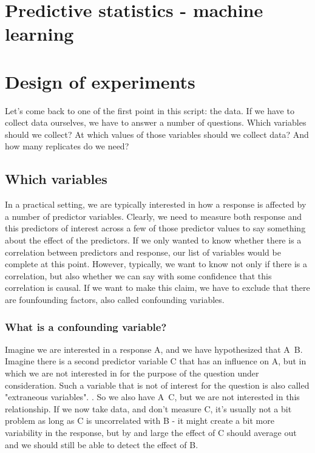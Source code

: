 \documentclass[a4paper,twoside]{tufte-book} %
\begin{document}
\chapter{Predictive statistics - machine learning}



\chapter{Design of experiments}

Let's come back to one of the first point in this script: the data. If we have to collect data ourselves, we have to answer a number of questions. Which variables should we collect? At which values of those variables should we collect data? And how many replicates do we need?

\section{Which variables}

In a practical setting, we are typically interested in how a response is affected by a number of predictor variables. Clearly, we need to measure both response and this predictors of interest across a few of those predictor values to say something about the effect of the predictors.  If we only wanted to know whether there is a correlation between predictors and response, our list of variables would be complete at this point. However, typically, we want to know not only if there is a correlation, but also whether we can say with some confidence that this correlation is causal. If we want to make this claim, we have to exclude that there are founfounding factors, also called confounding variables. 

\subsection{What is a confounding variable?}

Imagine we are interested in a response A, and we have hypothesized that A~B. Imagine there is a second predictor variable C that has an influence on A, but in which we are not interested in for the purpose of the question under consideration. Such a variable that is not of interest for the question is also called "extraneous variables". . So we also have A~C, but we are not interested in this relationship. If we now take data, and don't measure C, it's usually not a bit problem as long as C is uncorrelated with B - it might create a bit more variability in the response, but by and large the effect of C should average out and we should still be able to detect the effect of B.
\end{document}
